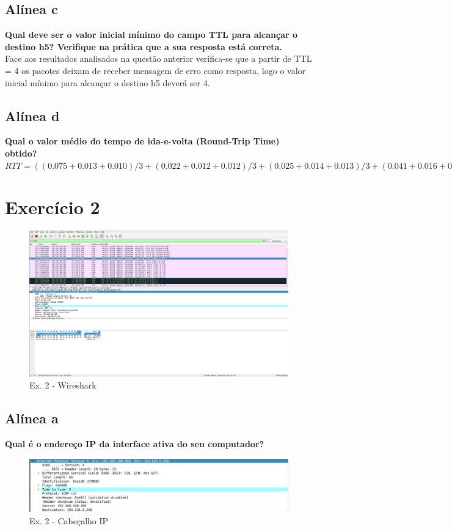 \documentclass[a4paper]{report}
\begin{document}
\subsection{Alínea c}
\textbf{Qual deve ser o valor inicial mínimo do campo TTL para alcançar o
destino h5? Verifique na prática que a sua resposta está correta.}\\
Face aos resultados analisados na questão anterior verifica-se que a partir de
TTL = 4 os pacotes deixam de receber mensagem de erro como resposta, logo o
valor inicial mínimo para alcançar o destino h5 deverá ser 4.

\subsection{Alínea d}
\textbf{Qual o valor médio do tempo de ida-e-volta (Round-Trip Time) obtido?}\\
\begin{math}
RTT = ((0.075 + 0.013 + 0.010) / 3 + (0.022 + 0.012 + 0.012) / 3 + (0.025 +
0.014 + 0.013) / 3 + (0.041 + 0.016 + 0.015) / 3) * 2 = 0.178
\end{math}

\section{Exercício 2}

\begin{figure}[H]
    \centering 
    \includegraphics[width=\textwidth]{images/wiresharkEx2.png}  
    \caption{Ex. 2 - Wireshark}
    \label{fig:wiresharkEx2}
\end{figure}

\subsection{Alínea a}
\textbf{Qual é o endereço IP da interface ativa do seu computador?}
\begin{figure}[H]
    \centering 
    \includegraphics[width=\textwidth]{images/ipEx2.png}
    \caption{Ex. 2 - Cabeçalho IP}
    \label{fig:ipEx2}
\end{figure}
\end{document}
